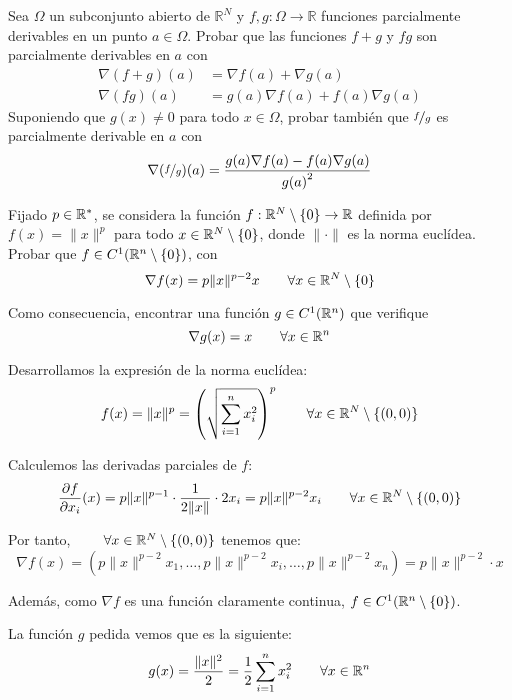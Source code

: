 \begin{ejercicio}
    Sea $\Omega$ un subconjunto abierto de $\mathbb{R}^N$ y $f,g:\Omega\to\mathbb{R}$ funciones parcialmente derivables en un punto $a\in \Omega$. Probar que las funciones $f+g$ y $fg$ son parcialmente derivables en $a$ con
    \begin{align*}
        \nabla (f+g)(a) &= \nabla f(a) + \nabla g(a) \\
        \nabla(fg)(a) &= g(a)\nabla f(a) + f(a) \nabla g(a)
    \end{align*}
    Suponiendo que $g(x)\neq 0$ para todo $x\in \Omega$, probar también que $\nicefrac{f}{g}$ es parcialmente derivable en $a$ con
    \begin{equation*}
        \nabla(\nicefrac{f}{g})(a) = \dfrac{g(a) \nabla f(a) - f(a) \nabla g(a)}{{g(a)}^{2}}
    \end{equation*}
\end{ejercicio}

\begin{ejercicio}
    Fijado $p\in \mathbb{R}^\ast$, se considera la función $f:\mathbb{R}^N\setminus \{0\}\to \mathbb{R}$ definida por $f(x) = \|x\|^p$ para todo $x\in \mathbb{R}^N\setminus \{0\}$, donde $\|\cdot\|$ es la norma euclídea. Probar que $f\in C^1(\mathbb{R}^n\setminus \{0\})$, con
    \begin{equation*}
        \nabla f(x) = p\|x\|^{p-2}x \qquad \forall x\in \mathbb{R}^N\setminus \{0\}
    \end{equation*}

    Como consecuencia, encontrar una función $g\in C^1(\mathbb{R}^n)$ que verifique 
    \begin{equation*}
        \nabla g(x)=x \qquad \forall x\in \mathbb{R}^n
    \end{equation*}

    Desarrollamos la expresión de la norma euclídea:
    \begin{equation*}
        f(x) = \|x\|^p = \left(\sqrt{\sum_{i=1}^n x_i^2}\right)^p \qquad \forall x\in \mathbb{R}^N\setminus \{(0,0)\}
    \end{equation*}

    Calculemos las derivadas parciales de $f$:
    \begin{equation*}
        \frac{\partial f}{\partial x_i}(x) = p\|x\|^{p-1}\cdot \frac{1}{2\|x\|}\cdot 2x_i = p\|x\|^{p-2}x_i \qquad \forall x\in \mathbb{R}^N\setminus \{(0,0)\}
    \end{equation*}

    Por tanto, $\qquad \forall x\in \mathbb{R}^N\setminus \{(0,0)\}$ tenemos que:
    \begin{equation*}
        \nabla f(x) = \left(p\|x\|^{p-2}x_1,\dots, p\|x\|^{p-2}x_i, \dots, p\|x\|^{p-2}x_n\right) = p\|x\|^{p-2} \cdot x
    \end{equation*}

    Además, como $\nabla f$ es una función claramente continua, $f\in C^1(\mathbb{R}^n\setminus \{0\})$.

    La función $g$ pedida vemos que es la siguiente:
    \begin{equation*}
        g(x) = \frac{\|x\|^2}{2} = \frac{1}{2} \sum_{i=1}^n x_i^2 \qquad \forall x\in \mathbb{R}^n
    \end{equation*}
\end{ejercicio}

